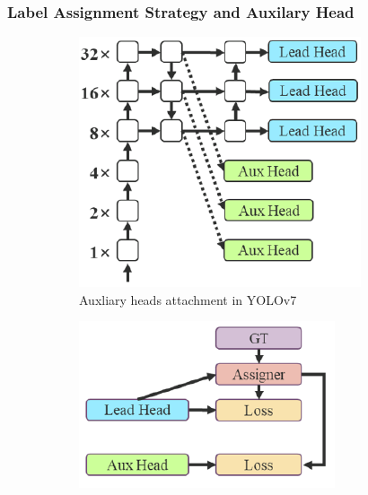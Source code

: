   \subsubsection{Label Assignment Strategy and Auxilary Head}
  \begin{figure}[H]
      \centering

      \begin{subfigure}[][][t]{0.3\textwidth}
        \includegraphics[width=1\linewidth]{figures/auxilary-head.png}
        \caption{Auxliary heads attachment in YOLOv7}
        \label{fig:aux-head}
      \end{subfigure}\hfill
      \begin{subfigure}[][][t]{0.3\textwidth}
        \includegraphics[width=1\linewidth]{figures/lead-head-assigner.png}

\end{subfigure}
\end{figure}
